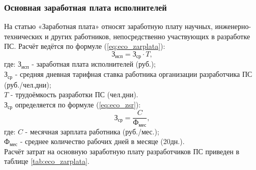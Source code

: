 \subsubsection*{Основная заработная плата исполнителей}
На статью «Заработная плата» относят заработную плату научных, инженерно-технических и других работников,
непосредственно участвующих в разработке ПС. Расчёт ведётся по формуле (\ref{eq:eco_zarplata}):
\begin{equation}
\mbox{З}_{\mbox{исп}} = \mbox{З}_{\mbox{ср}} \cdot{T},
\label{eq:eco_zarplata}
\end{equation}
где:	${\mbox{З}_{\mbox{исп}}}$ - заработная плата исполнителей (руб.); \\
	${\mbox{З}_{\mbox{ср}}}$ -  средняя дневная тарифная ставка работника организации разработчика ПС (руб./чел.дни); \\
	${T}$ - трудоёмкость разработки ПС (чел.дни). \\

${\mbox{З}_{\mbox{ср}}}$ определяется по формуле (\ref{eq:eco_zsr}):
\begin{equation}
\mbox{З}_{\mbox{ср}} = \frac{C}{\mbox{Ф}_{\mbox{мес}}},
\label{eq:eco_zsr}
\end{equation}
где:	${C}$ - месячная зарплата работника (руб./мес.); \\
	${\mbox{Ф}_{\mbox{мес}}}$ - среднее количество рабочих дней в месяце (20дн.). \\

Расчёт затрат на основную заработную плату разработчиков ПС приведен в таблице \ref{tab:eco_zarplata}.

